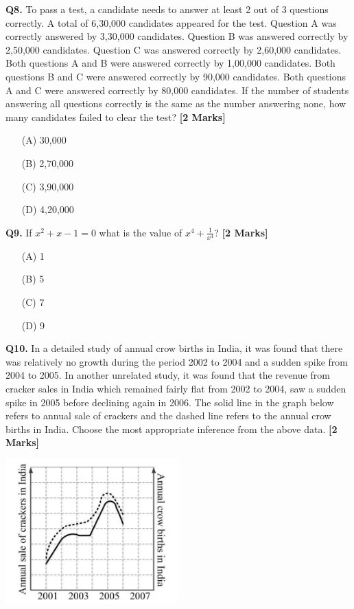 \documentclass[11pt]{article}
\newcommand{\questionb}[2]{
    \noindent\textbf{Q#2.} #1 \hfill \textbf{[2 Marks]}
}
\begin{document}
\questionb{To pass a test, a candidate needs to answer at least 2 out of 3 questions correctly. A total of 6,30,000 candidates appeared for the test. Question A was correctly answered by 3,30,000 candidates. Question B was answered correctly by 2,50,000 candidates. Question C was answered correctly by 2,60,000 candidates. Both questions A and B were answered correctly by 1,00,000 candidates. Both questions B and C were answered correctly by 90,000 candidates. Both questions A and C were answered correctly by 80,000 candidates. If the number of students answering all questions correctly is the same as the number answering none, how many candidates failed to clear the test?}{8}
\begin{enumerate}
    \item[(A)] 30,000  
    \item[(B)] 2,70,000  
    \item[(C)] 3,90,000  
    \item[(D)] 4,20,000  
\end{enumerate}
\vspace{0.5cm}

\questionb{If \(x^2 + x - 1 = 0\) what is the value of \(x^4 + \frac{1}{x^4}\)?}{9}
\begin{enumerate}
    \item[(A)] 1  
    \item[(B)] 5  
    \item[(C)] 7  
    \item[(D)] 9  
\end{enumerate}
\vspace{0.5cm}

\questionb{In a detailed study of annual crow births in India, it was found that there was relatively no growth during the period 2002 to 2004 and a sudden spike from 2004 to 2005. In another unrelated study, it was found that the revenue from cracker sales in India which remained fairly flat from 2002 to 2004, saw a sudden spike in 2005 before declining again in 2006. The solid line in the graph below refers to annual sale of crackers and the dashed line refers to the annual crow births in India. Choose the most appropriate inference from the above data.}{10}

\begin{center}
\includegraphics[width=0.5\textwidth]{figures/10.png}
\end{center}
\end{document}
